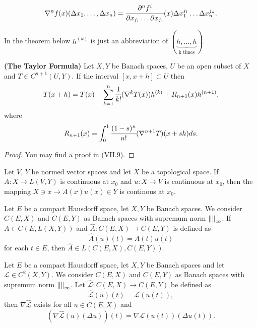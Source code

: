 \documentclass[main.tex]{subfiles}
\begin{document}
\begin{proposition}
\begin{equation}
\nabla^n f (x)(\Delta x_1, \dots, \Delta x_n) = 
\cfrac{\partial^n f^i}{\partial x_{j_1}\dots \partial x_{j_1}}(x)\Delta x^{j_1}_1 \dots \Delta x^{j_n}_n.
\end{equation}
\end{proposition}
In the theorem below $h^{(k)}$ is just an abbreviation of $(\underbrace{h, \dots, h}_\text{k times})$.
\begin{theorem}
\textbf{(The Taylor Formula)}
Let $X, Y$ be Banach spaces, $U$ be an open subset of $X$ and $T\in C^{n+1}(U, Y)$. If the interval $[x, x+h]\subset U$ then
\begin{equation}
T(x + h) = T(x) + \sum_{k = 1}^n \cfrac{1}{k!}(\nabla^kT(x))h^{(k)} + R_{n+1}(x)h^{(n + 1)},
\end{equation}
where
\begin{equation}
    R_{n+1}(x) = \int_0^1 \cfrac{(1-s)^n}{n!}(\nabla^{n+1}T)(x + sh)ds.
\end{equation}
\end{theorem}
\begin{proof}
You may find a proof in \cite{maurin1976} (VII.9).
\end{proof}

\begin{theorem}
Let $V$, $Y$ be normed vector spaces and let $X$ be a topological space. If $A:X\to L(V, Y)$ is continuous at $x_0$ and $u:X\to V$ is continuous at $x_0$, then the mapping $X\ni x \to A(x)u(x) \in Y$ is continous at $x_0$.  
\end{theorem}

\begin{theorem}
Let $E$ be a compact Hausdorff space, let $X, Y$ be Banach spaces.
We consider $C(E, X)$ and $C(E, Y)$ as Banach spaces with supremum norm $\norm{}_{\infty}$.
If $A\in C(E, L(X, Y))$ and $\hat{A} : C(E, X)\to C(E, Y)$ is defined as
\begin{equation}
    \hat{A}(u)(t) = A(t)u(t)
\end{equation}
for each $t\in E$, then $\hat{A}\in L(C(E, X),  C(E, Y))$.
\end{theorem}

\begin{theorem}
Let $E$ be a compact Hausdorff space, let $X, Y$ be Banach spaces and let $\mathcal{L}\in C^2(X, Y)$.
We consider $C(E, X)$ and $C(E, Y)$ as Banach spaces with supremum norm $\norm{}_{\infty}$.
Let $\hat{\mathcal{L}}: C(E, X)\to C(E, Y)$ be defined as
\begin{equation}
    \hat{\mathcal{L}}(u)(t) = \mathcal{L}(u(t)),
\end{equation}
then $\nabla \hat{\mathcal{L}}$ exists for all $u\in C(E, X)$ and
\begin{equation}
    (\nabla \hat{\mathcal{L}}(u)(\Delta u))(t) = \nabla \mathcal{L}(u(t))(\Delta u(t)). 
\end{equation}
\end{theorem}
\end{document}
